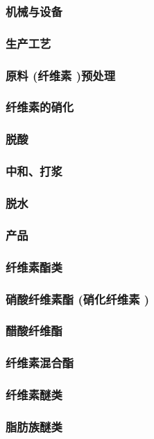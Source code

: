 \documentclass[UTF8]{../../ApplicationUniverse}
\begin{document}
    \subsubsection{机械与设备}
    \subsubsection{生产工艺}
        \subsubsection{原料 (纤维素 )预处理}
        \subsubsection{纤维素的硝化}
        \subsubsection{脱酸}
        \subsubsection{中和、打浆}
        \subsubsection{脱水}
    \subsubsection{产品}
        \subsubsection{纤维素酯类}
            \subsubsection{硝酸纤维素酯 (硝化纤维素 )}
            \subsubsection{醋酸纤维酯}
            \subsubsection{纤维素混合酯}
        \subsubsection{纤维素醚类}
            \subsubsection{脂肪族醚类}
\end{document}
